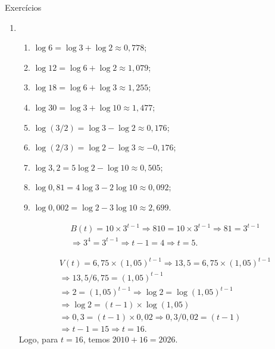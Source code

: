 \begin{answer}{Exercícios}
{
	\exerciselist
	\begin{enumerate}
	\item 
		\begin{enumerate}
		\item $\log 6 = \log 3+ \log 2 \approx 0{,}778$;
		\item $\log 12 = \log 6+ \log 2 \approx 1{,}079$;
		\item $\log 18 = \log 6+ \log 3 \approx 1{,}255$;
		\item $\log 30 = \log 3+ \log 10 \approx 1{,}477$;
		\item $\log (3/2) = \log 3 - \log 2 \approx 0{,}176$;
		\item $\log (2/3) = \log 2 - \log 3 \approx -0{,}176$;
		\item $\log 3{,}2 = 5\log 2 - \log 10 \approx 0{,}505$;
		\item $\log 0{,}81 = 4\log 3 - 2\log 10 \approx 0{,}092$;
		\item $\log 0{,}002 = \log 2 - 3\log 10 \approx 2{,}699$.
		\end{enumerate}
	\Item
		\begin{align*}
		&B(t) = 10 \times 3^{t-1} \Rightarrow  810 = 10 \times 3^{t-1}\Rightarrow  81 = 3^{t-1}\\
		&\Rightarrow  3^4 = 3^{t-1}\Rightarrow  t-1 =4\Rightarrow  t =5.
		\end{align*}
		
	\Item
		\begin{align*}
		&V(t) = 6{,}75 \times (1{,}05)^{t-1}\Rightarrow  13{,}5 = 6{,}75 \times (1{,}05)^{t-1}\\
		&\Rightarrow  13{,}5/6{,}75 =(1{,}05)^{t-1}\\
		&\Rightarrow  2 = (1{,}05)^{t-1}\Rightarrow  \log 2 = \log (1{,}05)^{t-1}\\
		&\Rightarrow  \log 2 = (t-1)\times \log (1{,}05)\\
		&\Rightarrow  0{,}3 = (t-1)\times 0{,}02\Rightarrow  0{,}3/0{,}02 = (t-1)\\
		&\Rightarrow  t-1=15\Rightarrow  t = 16.
		\end{align*}
		Logo, para $t = 16$, temos $2010 + 16 = 2026$.


\end{enumerate}}
\end{answer}
